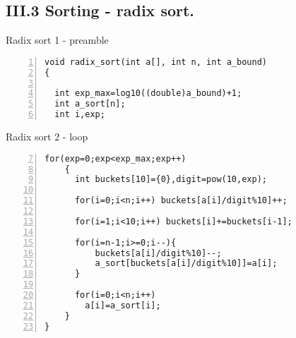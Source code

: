 \documentclass{beamer}
\begin{document}
\subsection*{III.3 Sorting - radix sort.}
\begin{frame}[fragile]{Radix sort 1 - preamble}
\begin{lstlisting}[numbers=left]
void radix_sort(int a[], int n, int a_bound)
{

  int exp_max=log10((double)a_bound)+1;
  int a_sort[n];
  int i,exp;
\end{lstlisting}
\end{frame}
\begin{frame}[fragile]{Radix sort 2 - loop}
\begin{lstlisting}[numbers=left,firstnumber=7]
  for(exp=0;exp<exp_max;exp++)
    {
      int buckets[10]={0},digit=pow(10,exp);

      for(i=0;i<n;i++) buckets[a[i]/digit%10]++;

      for(i=1;i<10;i++) buckets[i]+=buckets[i-1];

      for(i=n-1;i>=0;i--){
          buckets[a[i]/digit%10]--;
          a_sort[buckets[a[i]/digit%10]]=a[i];
      }

      for(i=0;i<n;i++)
        a[i]=a_sort[i];
    }
}
\end{lstlisting}
\end{frame}
\end{document}
